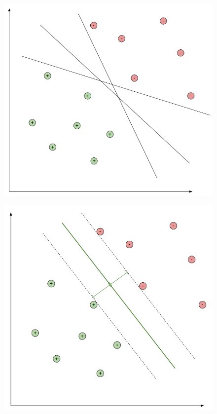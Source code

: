 \documentclass[12pt]{article}
\begin{document}
\begin{figure}[!ht]
\centering
\begin{minipage}{.5\textwidth}
  \centering
  \includegraphics[width=.8\linewidth]{img/multipleplans.png}
  \label{fig:multipleplans}
\end{minipage}%
\begin{minipage}{.5\textwidth}
  \centering
  \includegraphics[width=.8\linewidth]{img/wideststreet.png}
  \label{fig:wideststreet}
\end{minipage}
\end{figure}
\\
\end{document}
